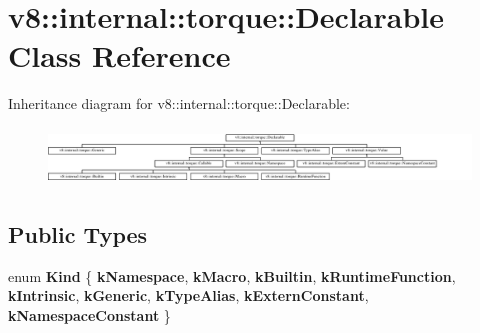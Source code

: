 \hypertarget{classv8_1_1internal_1_1torque_1_1Declarable}{}\section{v8\+:\+:internal\+:\+:torque\+:\+:Declarable Class Reference}
\label{classv8_1_1internal_1_1torque_1_1Declarable}
Inheritance diagram for v8\+:\+:internal\+:\+:torque\+:\+:Declarable\+:\begin{figure}[H]
\begin{center}
\leavevmode
\includegraphics[height=1.530055cm]{classv8_1_1internal_1_1torque_1_1Declarable}
\end{center}
\end{figure}
\subsection*{Public Types}
\begin{DoxyCompactItemize}
\item 
\mbox{\label{classv8_1_1internal_1_1torque_1_1Declarable_a9a4f0a94228de771ae7eef8f819b4793}} 
enum {\bfseries Kind} \{ \newline
{\bfseries k\+Namespace}, 
{\bfseries k\+Macro}, 
{\bfseries k\+Builtin}, 
{\bfseries k\+Runtime\+Function}, 
\newline
{\bfseries k\+Intrinsic}, 
{\bfseries k\+Generic}, 
{\bfseries k\+Type\+Alias}, 
{\bfseries k\+Extern\+Constant}, 
\newline
{\bfseries k\+Namespace\+Constant}
 \}
\end{DoxyCompactItemize}
